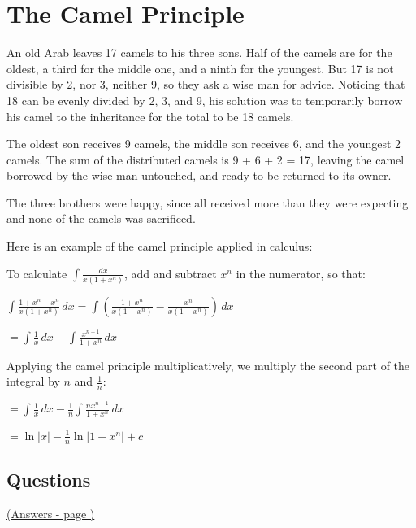 \documentclass[../main.tex]{subfiles}
\begin{document}
\section{The Camel Principle}
An old Arab leaves 17 camels to his three sons. Half of the camels are for the oldest, a third for the middle one, and a ninth for the youngest. But 17 is not divisible by 2, nor 3, neither 9, so they ask a wise man for advice. Noticing that 18 can be evenly divided by 2, 3, and 9, his solution was to temporarily borrow his camel to the inheritance for the total to be 18 camels.

The oldest son receives 9 camels, the middle son receives 6, and the youngest 2 camels. The sum of the distributed camels is 9 + 6 + 2 = 17, leaving the camel borrowed by the wise man untouched, and ready to be returned to its owner.

The three brothers were happy, since all received more than they were expecting and none of the camels was sacrificed.

Here is an example of the camel principle applied in calculus:

To calculate \(\int \frac{dx}{x(1+x^n)}\), add and subtract \(x^n\) in the numerator, so that:

\(\int \frac{1+x^n-x^n}{x(1+x^n)}\,dx=\int (\frac{1+x^n}{x(1+x^n)}-\frac{x^n}{x(1+x^n)})\,dx\)

\(=\int \frac{1}{x}\,dx-\int \frac{x^{n-1}}{1+x^n}\,dx\)

Applying the camel principle multiplicatively, we multiply the second part of the integral by \(n\) and \(\frac{1}{n}\):

\(=\int \frac{1}{x}\,dx-\frac{1}{n}\int \frac{nx^{n-1}}{1+x^n}\,dx\)

\(=\ln{|x|}-\frac{1}{n}\ln{|1+x^n|}+c\)

\pagebreak
\hypertarget{camelprinciplelink}{\subsection*{Questions}}
\hyperlink{camelprincipleanswers}{(Answers - page {\pageref*{Camel principle answers}})}

\label{Camel Principle}
\end{document}
